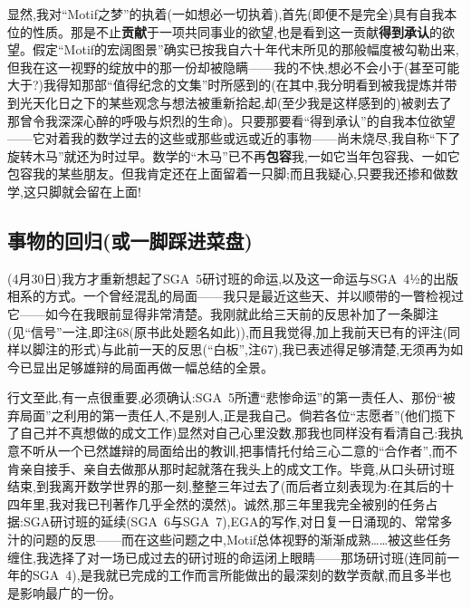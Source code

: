 显然,我对“Motif之梦”的执着(一如想必一切执着),首先(即便不是完全)具有自我本位的性质。那是不止\textbf{贡献}于一项共同事业的欲望,也是看到这一贡献\textbf{得到承认}的欲望。假定“Motif的宏阔图景”确实已按我自六十年代末所见的那般幅度被勾勒出来,但我在这一视野的绽放中的那一份却被隐瞒——我的不快,想必不会小于(甚至可能大于?)我得知那部“值得纪念的文集”时所感到的(在其中,我分明看到被我提炼并带到光天化日之下的某些观念与想法被重新拾起,却(至少我是这样感到的)被剥去了那曾令我深深心醉的呼吸与炽烈的生命)。只要那要看“得到承认”的自我本位欲望——它对着我的数学过去的这些或那些或远或近的事物——尚未烧尽,我自称“下了旋转木马”就还为时过早。数学的“木马”已不再\textbf{包容}我,一如它当年包容我、一如它包容我的某些朋友。但我肯定还在上面留着一只脚;而且我疑心,只要我还掺和做数学,这只脚就会留在上面!

\subsection{事物的回归(或一脚踩进菜盘)}


(4月30日)我方才重新想起了SGA~5研讨班的命运,以及这一命运与SGA~4½的出版相系的方式。一个曾经混乱的局面——我只是最近这些天、并以\dmark{}顺带的一瞥检视过它——如今在我眼前显得非常清楚。我刚就此给三天前的反思补加了一条脚注(见“信号”一注,即注68(原书此处题名如此)),而且我觉得,加上我前天已有的评注(同样以脚注的形式)与此前一天的反思(“白板”,注67),我已表述得足够清楚,无须再为如今已显出足够雄辩的局面再做一幅总结的全景。

行文至此,有一点很重要,必须确认:SGA~5所遭“悲惨命运”的第一责任人、那份“被弃局面”之利用的第一责任人,不是别人,正是我自己。倘若各位“志愿者”(他们揽下了自己并不真想做的成文工作)显然对自己心里没数,那我也同样没有看清自己:我执意不听从一个已然雄辩的局面给出的教训,把事情托付给三心二意的“合作者”,而不肯亲自接手、亲自去做那从那时起就落在我头上的成文工作。毕竟,从口头研讨班结束,到我离开数学世界的那一刻,整整三年过去了(而后者立刻表现为:在其后的十四年里,我对我已刊著作几乎全然的漠然)。诚然,那三年里我完全被别的任务占据:SGA研讨班的延续(SGA~6与SGA~7),EGA的写作,对日复一日涌现的、常常多汁的问题的反思——而在这些问题之中,Motif总体视野的渐渐成熟……被这些任务缠住,我选择了对一场已成过去的研讨班的命运闭上眼睛——那场研讨班(连同前一年的SGA~4),是我就已完成的工作而言所能做出的最深刻的数学贡献,而且多半也是影响最广的一份。

